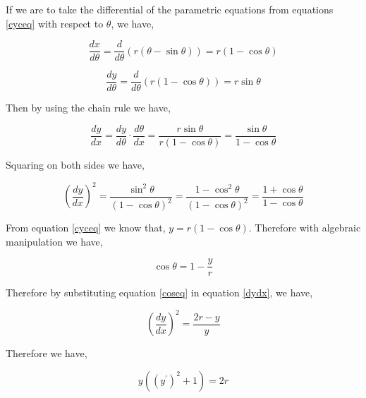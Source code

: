 

{If we are to take the differential of the parametric equations from equations \ref{cyceq} with respect to $\theta$, we have,}

	$$\frac{dx}{d\theta} = \frac{d}{d\theta}\left(r\left(\theta - \sin\theta\right)\right) = r\left(1 - \cos\theta\right)$$

	$$\frac{dy}{d\theta} = \frac{d}{d\theta}\left(r\left(1 - \cos\theta\right)\right) = r\sin\theta$$

{Then by using the chain rule we have,}

	$$\frac{dy}{dx} = \frac{dy}{d\theta}\cdot\frac{d\theta}{dx} = \frac{r\sin\theta}{r\left(1 - \cos\theta\right)} = \frac{\sin\theta}{1 - \cos\theta}$$

{Squaring on both sides we have,}

	\begin{equation}
		\left(\frac{dy}{dx}\right)^2 = \frac{\sin^2\theta}{\left(1 - \cos\theta\right)^2} = \frac{1 - \cos^2\theta}{\left(1 - \cos\theta\right)^2} = \frac{1 + \cos\theta}{1 - \cos\theta}
		\label{dydx}
	\end{equation}

{From equation \ref{cyceq} we know that, $y = r\left(1 - \cos\theta\right)$. Therefore with algebraic manipulation we have,}

	\begin{equation}
		\cos\theta = 1 -\frac{y}{r}
		\label{coseq}
	\end{equation}

{Therefore by substituting equation \ref{coseq} in equation \ref{dydx}, we have,}

	\begin{equation}
		\left(\frac{dy}{dx}\right)^2 = \frac{2r - y}{y}
		\label{dydxry}
	\end{equation}

{Therefore we have,}

	$$y\left(\left(y^{\prime}\right)^2 + 1\right) = 2r$$


